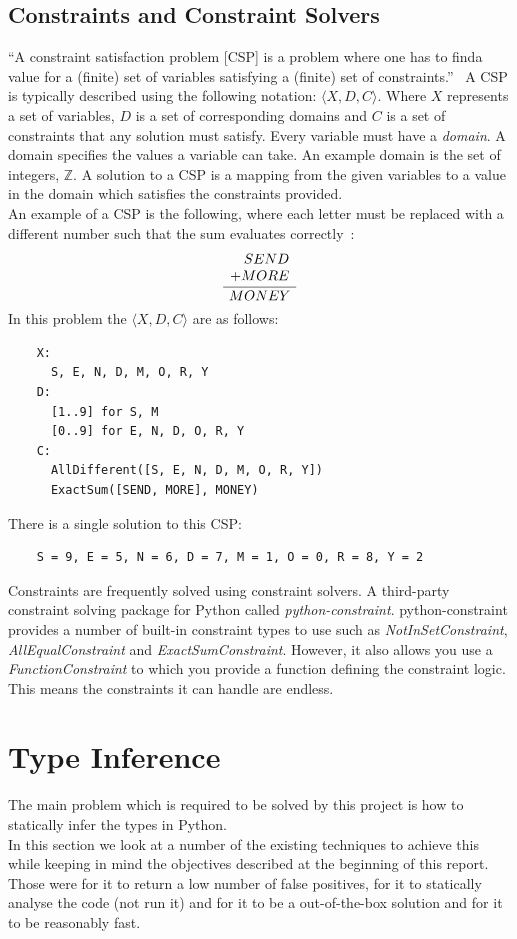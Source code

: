\documentclass[12pt, titlepage]{article}
\begin{document}
\subsection{Constraints and Constraint Solvers}
``A constraint satisfaction problem [CSP] is a problem where one has to finda  value for a (finite) set of variables satisfying a (finite) set of constraints.''~\cite{constraintBook} A CSP is typically described using the following notation: $\langle X, D, C \rangle$. Where $X$ represents a set of variables, $D$ is a set of corresponding domains and $C$ is a set of constraints that any solution must satisfy. Every variable must have a \textit{domain}. A domain specifies the values a variable can take. An example domain is the set of integers, $\mathbb{Z}$. A solution to a CSP is a mapping from the given variables to a value in the domain which satisfies the constraints provided. \\
An example of a CSP is the following, where each letter must be replaced with a different number such that the sum evaluates correctly~\cite{constraintPrinciples}: \\
\begin{equation*}
\frac{
    \begin{array}[b]{r}
      SEND \\
      + MORE
    \end{array}
  }{
    MONEY
  }
\end{equation*}
In this problem the  $\langle X, D, C \rangle$ are as follows:
\begin{verbatim}
    X:
      S, E, N, D, M, O, R, Y 
    D:
      [1..9] for S, M
      [0..9] for E, N, D, O, R, Y
    C:
      AllDifferent([S, E, N, D, M, O, R, Y])
      ExactSum([SEND, MORE], MONEY)
\end{verbatim}
There is a single solution to this CSP:
\begin{verbatim}
    S = 9, E = 5, N = 6, D = 7, M = 1, O = 0, R = 8, Y = 2
\end{verbatim}
Constraints are frequently solved using constraint solvers. A third-party constraint solving package for Python called \textit{python-constraint}. python-constraint provides a number of built-in constraint types to use such as \textit{NotInSetConstraint}, \textit{AllEqualConstraint} and \textit{ExactSumConstraint}. However, it also allows you use a \textit{FunctionConstraint} to which you provide a function defining the constraint logic. This means the constraints it can handle are endless.

\newpage
\section{Type Inference}
The main problem which is required to be solved by this project is how to statically infer the types in Python. \\
In this section we look at a number of the existing techniques to achieve this while keeping in mind the objectives described at the beginning of this report. Those were for it to return a low number of false positives, for it to statically analyse the code (not run it) and for it to be a out-of-the-box solution and for it to be reasonably fast.
\end{document}
